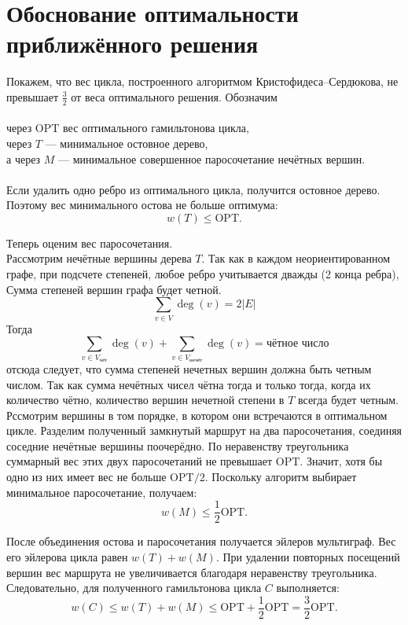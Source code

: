 \documentclass[12pt,a4paper]{article}
\begin{document}
\section*{Обоснование оптимальности приближённого решения}

Покажем, что вес цикла, построенного алгоритмом
Кристофидеса--Сердюкова, не превышает
$\frac{3}{2}$ от веса оптимального решения.
Обозначим \\\\через $\mathrm{OPT}$ вес оптимального
гамильтонова цикла,\\ через $T$ --- минимальное
остовное дерево,\\ а через $M$ --- минимальное
совершенное паросочетание нечётных вершин.\\\\
Если удалить одно ребро из оптимального цикла,
получится остовное дерево. Поэтому вес
минимального остова не больше оптимума:
\[
    w(T) \leq \mathrm{OPT}.
\]

Теперь оценим вес паросочетания.\\ Рассмотрим
нечётные вершины дерева $T$. Так как в каждом неориентированном графе,
при подсчете степеней, любое ребро учитывается дважды (2 конца ребра),
Сумма степеней вершин графа будет четной.\\
\[
\sum_{v \in V} \deg(v) = 2|E|
\]
Тогда 
\[
\sum_{v \in V_{\text{чёт}}} \deg(v)
+
\sum_{v \in V_{\text{нечёт}}} \deg(v)
= \text{чётное число}
\] 
отсюда следует, что сумма степеней нечетных вершин должна быть четным числом.
Так как сумма нечётных чисел чётна тогда и только тогда, когда их количество чётно, количество вершин 
нечетной степени в $T$ всегда будет четным.\\

Рссмотрим вершины в том порядке,
в котором они встречаются в оптимальном цикле. Разделим полученный
замкнутый маршрут на два паросочетания,
соединяя соседние нечётные вершины поочерёдно.
По неравенству треугольника суммарный вес
этих двух паросочетаний не превышает
$\mathrm{OPT}$. Значит, хотя бы одно из них
имеет вес не больше $\mathrm{OPT}/2$.
Поскольку алгоритм выбирает минимальное
паросочетание, получаем:
\[
    w(M) \leq \frac{1}{2}\mathrm{OPT}.
\]

После объединения остова и паросочетания
получается эйлеров мультиграф. Вес его
эйлерова цикла равен $w(T)+w(M)$.
При удалении повторных посещений вершин
вес маршрута не увеличивается благодаря
неравенству треугольника. Следовательно,
для полученного гамильтонова цикла $C$
выполняется:
\[
    w(C) \leq w(T)+w(M)
    \leq \mathrm{OPT}+\frac{1}{2}\mathrm{OPT}
    = \frac{3}{2}\mathrm{OPT}.
\]
\end{document}
